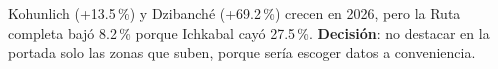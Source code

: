 \begin{opciones}
Kohunlich (+13.5\,\%) y Dzibanché (+69.2\,\%) crecen en 2026, pero la Ruta completa bajó 8.2\,\% porque Ichkabal cayó
27.5\,\%. \textbf{Decisión}: no destacar en la portada solo las zonas que suben, porque sería escoger datos a conveniencia.
\end{opciones}
